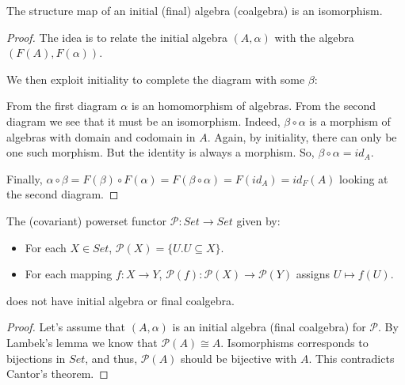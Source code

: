 \begin{lem}[Lambeck]
The structure map of an initial (final) algebra (coalgebra) is an isomorphism.
\end{lem}
\begin{proof}
The idea is to relate the initial algebra $(A,\alpha)$ with the algebra $(F(A),F(\alpha))$.


We then exploit initiality to complete the diagram with some $\beta$:


From the first diagram $\alpha$ is an homomorphism of algebras. From the second diagram we see that it must be an isomorphism. Indeed, $\beta \circ \alpha$ is a morphism of algebras with domain and codomain in $A$. Again, by initiality, there can only be one such morphism. But the identity is always a morphism. So, $\beta \circ \alpha = id_A$. 

Finally, $\alpha \circ \beta = F(\beta) \circ F(\alpha) = F(\beta \circ \alpha) = F(id_A) = id_F(A)$ looking at the second diagram.
\end{proof}

\begin{cor}
	The (covariant) powerset functor $\mathcal{P}: Set \to Set$ given by:
	
	\begin{itemize}
		\item For each $X \in Set$, $\mathcal{P}(X) = \{U. U \subseteq X\}$.
		\item For each mapping $f:X \to Y$, $\mathcal{P}(f): \mathcal{P}(X) \to \mathcal{P}(Y)$ assigns $U \mapsto f(U)$.
	\end{itemize}
	
	
	does not have initial algebra or final coalgebra.
\end{cor}
\begin{proof}
	Let's assume that $(A,\alpha)$ is an initial algebra (final coalgebra) for $\mathcal{P}$. By Lambek's lemma we know that $\mathcal{P}(A) \cong A$. Isomorphisms corresponds to bijections in $Set$, and thus, $\mathcal{P}(A)$ should be bijective with $A$. This contradicts Cantor's theorem.
\end{proof}

